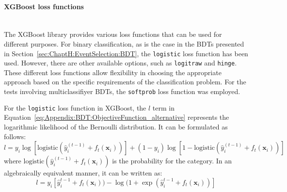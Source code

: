 \paragraph{XGBoost loss functions}\mbox{}\\ %

The XGBoost library provides various loss functions that can be used for different purposes. 
For binary classification, as is the case in the BDTs presented in Section~\ref{sec:ChaptH:EventSelection:BDT},
the \texttt{logistic} loss function has been used. However, there are other available options, such as \texttt{logitraw} and 
\texttt{hinge}.  These different loss functions allow flexibility in choosing the appropriate approach based 
on the specific requirements of the classification problem.
For the tests involving multiclassifiyer BDTs, the \texttt{softprob} loss function was employed. %

For the \texttt{logistic} loss function in XGBoost, the $l$ term in 
Equation~\ref{eq:Appendix:BDT:ObjectiveFunction_alternative} represents the logarithmic likelihood 
of the Bernoulli distribution. It can be formulated as follows:
\begin{equation*}
\label{eq:Appendix:BDT:binaryLogistic_A}
	l = y_i \log[\text{logistic}(\hat{y}_i^{(t-1)} + f_t(\bm{x}_i))] + (1-y_i)\log[1-\text{logistic}(\hat{y}_i^{(t-1)} + f_t(\bm{x}_i))] \,
\end{equation*}
where $\text{logistic}(\hat{y}_i^{(t-1)} + f_t(\bm{x}_i))$ is the probability for the category.  
In an algebraically equivalent manner, it can be written as:
\begin{equation*}
\label{eq:Appendix:BDT:binaryLogistic_B}
	l = y_i [\hat{y}_i^{t-1} + f_t(\bm{x}_i)) - \log(1 + \exp (\hat{y}_i^{t-1} + f_t(\bm{x}_i))]
\end{equation*}






